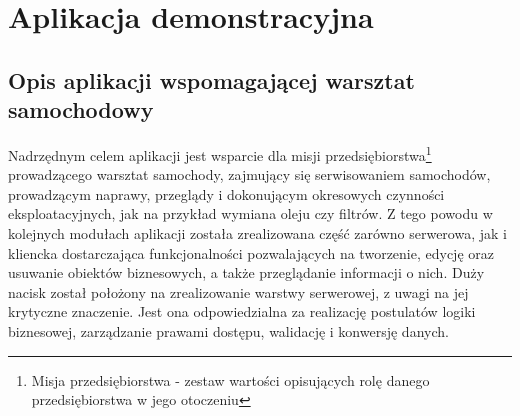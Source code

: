 \chapter{Aplikacja demonstracyjna}
\label{chapter:app}

\section{Opis aplikacji wspomagającej warsztat samochodowy}
	
	Nadrzędnym celem aplikacji jest wsparcie dla misji przedsiębiorstwa\footnote{Misja przedsiębiorstwa - zestaw wartości opisujących rolę danego przedsiębiorstwa w jego otoczeniu} prowadzącego warsztat samochody, zajmujący się serwisowaniem samochodów, prowadzącym naprawy, przeglądy i dokonującym okresowych czynności eksploatacyjnych, jak na przykład wymiana oleju czy filtrów. Z tego powodu w kolejnych modułach aplikacji została zrealizowana część zarówno serwerowa, jak i kliencka dostarczająca funkcjonalności pozwalających na tworzenie, edycję oraz usuwanie obiektów biznesowych, a także przeglądanie informacji o nich. Duży nacisk został położony na zrealizowanie warstwy serwerowej, z uwagi na jej krytyczne znaczenie. Jest ona odpowiedzialna za realizację postulatów logiki biznesowej, zarządzanie prawami dostępu, walidację i konwersję danych. 
		
